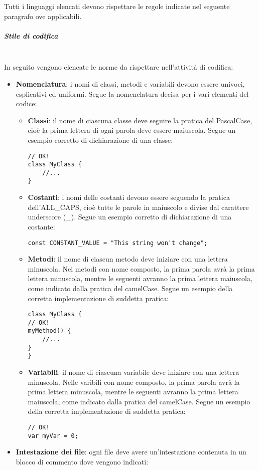 Tutti i linguaggi elencati devono rispettare le regole indicate nel seguente paragrafo ove applicabili.
\subparagraph*{Stile di codifica}\mbox{}\\ [1mm]
In seguito vengono elencate le norme da rispettare nell'attività di codifica:
\begin{itemize}
	\item \textbf{Nomenclatura}: i nomi di classi, metodi e variabili devono essere univoci, esplicativi ed uniformi. Segue la nomenclatura decisa per i vari elementi del codice:
	\begin{itemize}
		\item \textbf{Classi}: il nome di ciascuna classe deve seguire la pratica del PascalCase, cioè la prima lettera di ogni parola deve essere maiuscola. Segue un esempio corretto di dichiarazione di una classe:
\begin{lstlisting}
// OK!
class MyClass {
	//...
}
\end{lstlisting} 
		\item \textbf{Costanti}: i nomi delle costanti devono essere seguendo la pratica dell'ALL\_CAPS, cioè tutte le parole in maiuscolo e divise dal carattere underscore (\_). Segue un esempio corretto di dichiarazione di una costante:
\begin{lstlisting}
const CONSTANT_VALUE = "This string won't change";
\end{lstlisting}
		\item \textbf{Metodi}: il nome di ciascun metodo deve iniziare con una lettera minuscola. Nei metodi con nome composto, la prima parola avrà la prima lettera minuscola, mentre le seguenti avranno la prima lettera maiuscola, come indicato dalla pratica del camelCase. Segue un esempio della corretta implementazione di suddetta pratica:
\begin{lstlisting}
class MyClass {
// OK!
myMethod() {
	//...
}
}
\end{lstlisting}
	\item \textbf{Variabili}: il nome di ciascuna variabile deve iniziare con una lettera minuscola. Nelle varibili con nome composto, la prima parola avrà la prima lettera minuscola, mentre le seguenti avranno la prima lettera maiuscola, come indicato dalla pratica del camelCase. Segue un esempio della corretta implementazione di suddetta pratica:
\begin{lstlisting}
// OK!
var myVar = 0;
\end{lstlisting}
	\end{itemize}
	\item \textbf{Intestazione dei file}: ogni file deve avere un'intestazione contenuta in un blocco di commento dove vengono indicati:

\end{itemize}
